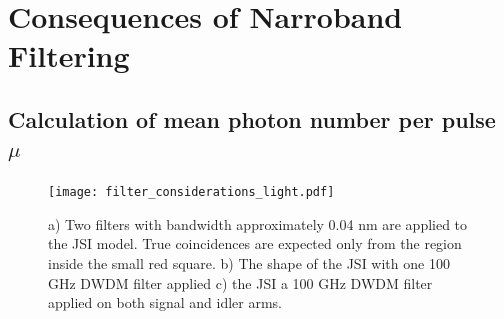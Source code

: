 \documentclass[11pt]{caltech_thesis} %
\begin{document}
\hypertarget{consequences-of-narroband-filtering}{%
\section{Consequences of Narroband Filtering}\label{consequences-of-narroband-filtering}}

\hypertarget{calculation-of-mean-photon-number-per-pulse}{%
\subsection{\texorpdfstring{Calculation of mean photon number per pulse \texorpdfstring{$\mu$}{(mu)}}{Calculation of mean photon number per pulse }}\label{calculation-of-mean-photon-number-per-pulse}}

\begin{figure}[H]
    \centering
    \texttt{[image: filter\_considerations\_light.pdf]}
    \caption{a) Two filters with bandwidth approximately 0.04 nm are applied to the JSI model. True coincidences are expected only from the region inside the small red square. b) The shape of the JSI with one 100 GHz DWDM filter applied c) the JSI a 100 GHz DWDM filter applied on both signal and idler arms. }
    \label{fig:narroband}
\end{figure}
\end{document}
